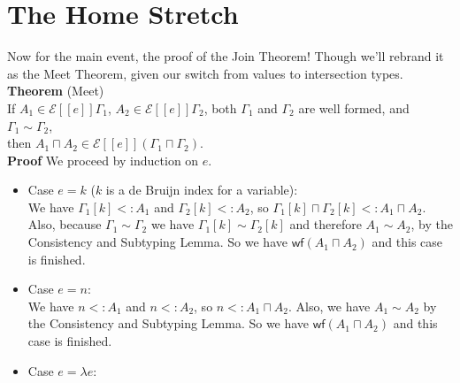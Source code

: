 \documentclass{article}
\newcommand{\SEM}[1]{[\![ #1 ]\!]}
\newcommand{\ESEM}[1]{\mathcal{E}\SEM{#1}}
\newcommand{\WF}[1]{\mathsf{wf}(#1)}
\begin{document}
\section{The Home Stretch}

Now for the main event, the proof of the Join Theorem!  Though we'll
rebrand it as the Meet Theorem, given our switch from values to
intersection types.\\

\noindent \textbf{Theorem} (Meet)\\
If $A_1 \in \ESEM{e}\Gamma_1$, $A_2 \in \ESEM{e}\Gamma_2$,
both $\Gamma_1$ and $\Gamma_2$ are well formed,
and $\Gamma_1 \sim \Gamma_2$, \\
then $A_1 \sqcap A_2 \in \ESEM{e}(\Gamma_1\sqcap\Gamma_2)$. \\[1ex]
%
\textbf{Proof}
We proceed by induction on $e$.
\begin{itemize}
\item Case $e=k$ ($k$ is a de Bruijn index for a variable):\\
  We have $\Gamma_1[k] <: A_1$ and $\Gamma_2[k] <: A_2$,
  so $\Gamma_1[k] \sqcap \Gamma_2[k] <: A_1 \sqcap A_2$.
  Also, because $\Gamma_1 \sim \Gamma_2$ we have
  $\Gamma_1[k] \sim \Gamma_2[k]$ and therefore
  $A_1 \sim A_2$, by the Consistency and Subtyping Lemma.
  So we have $\WF{A_1 \sqcap A_2}$ and this case is finished.
  
\item Case $e=n$: \\
  We have $n <: A_1$ and $n <: A_2$, so $n <: A_1 \sqcap A_2$.
  Also, we have $A_1 \sim A_2$ by the Consistency and Subtyping Lemma.
  So we have $\WF{A_1 \sqcap A_2}$ and this case is finished.

\item Case $e=\lambda e$: \\
  
\end{itemize}
\end{document}
